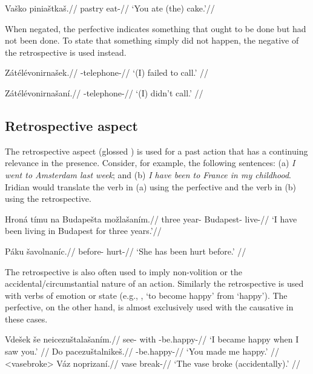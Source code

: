 \pex
\begingl
\gla Va\v{s}ko pinia\v{s}tka\v{s}.//
\glb pastry eat-//
\glft `You ate (the) cake.'//
\endgl
\xe


\par When negated, the perfective indicates something that ought to be done but had not been done. To state that something simply did not happen, the negative of the retrospective is used instead.

\pex
\begingl
\gla Z\'at\'el\'evonirna\v{s}ek.//
\glb {}-telephone-//
\glft `(I) failed to call.' //
\endgl
\xe

\pex
\begingl
\gla Z\'at\'el\'evonirna\v{s}an\'i.//
\glb {}-telephone-//
\glft `(I) didn't call.' //
\endgl
\xe

\subsection{Retrospective aspect}
\par The retrospective aspect (glossed ) is used for a past action that has a continuing relevance in the presence. Consider, for example, the following sentences: (a) \textit{I went to Amsterdam last week}; and (b) \textit{I have been to France in my childhood}. Iridian would translate the verb in (a) using the perfective and the verb in (b) using the retrospective.

\begingl
\gla Hroná tímu na Budape\v{s}ta mo\v{z}la\v{s}an\'im.//
\glb three year-  Budapest- live-//
\glft `I have been living in Budapest for three years.'//
\endgl
\xe

\begingl
\gla Páku \v{s}avolnan\'ic.//
\glb before- hurt-//
\glft `She has been hurt before.' //
\endgl
\xe

\par The retrospective is also often used to imply non-volition or the  accidental/circumstantial nature of an action. Similarly the retrospective is used with verbs of emotion or state (e.g., , ‘to become happy’ from  ‘happy’). The perfective, on the other hand, is almost exclusively used with the causative in these cases.

\pex
\a	\begingl
\gla Vde\v{s}ek \v{s}e neicezu\v{s}tala\v{s}an\'im.//
\glb see- with -be.happy-//
\glft `I became happy when I saw you.' //
\endgl
\a	\begingl
\gla Do pacezu\v{s}talnike\v{s}.//
\glb {} -be.happy-//
\glft `You made me happy.' //
\endgl
\xe
\pex<vasebroke>
\begingl
\gla Váz noprizan\'i.//
\glb vase break-//
\glft `The vase broke (accidentally).' //
\endgl
\xe

